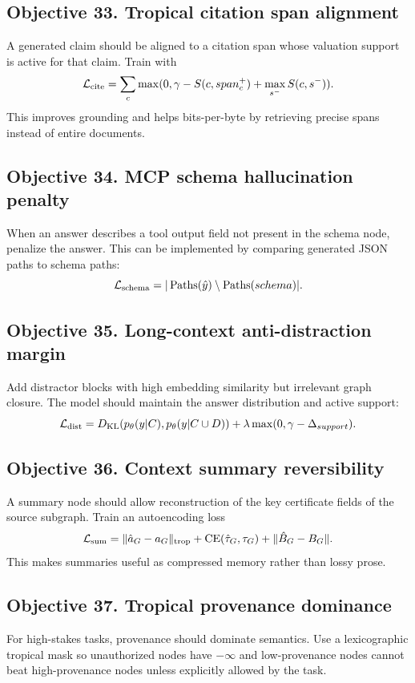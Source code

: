 \documentclass[11pt]{article}
\theoremstyle{definition}
\theoremstyle{remark}
\begin{document}
\subsection{Objective 33. Tropical citation span alignment}
A generated claim should be aligned to a citation span whose valuation support is active for that claim. Train with
\[
    \mathcal L_{\rm cite}=\sum_c\max(0,\gamma-S(c,span_c^+)+\max_{s^-}S(c,s^-)).
\]
This improves grounding and helps bits-per-byte by retrieving precise spans instead of entire documents.

\subsection{Objective 34. MCP schema hallucination penalty}
When an answer describes a tool output field not present in the schema node, penalize the answer. This can be implemented by comparing generated JSON paths to schema paths:
\[
    \mathcal L_{\rm schema}=|\operatorname{Paths}(\hat y)\setminus \operatorname{Paths}(schema)|.
\]

\subsection{Objective 35. Long-context anti-distraction margin}
Add distractor blocks with high embedding similarity but irrelevant graph closure. The model should maintain the answer distribution and active support:
\[
    \mathcal L_{\rm dist}=D_{\rm KL}(p_\theta(y|C),p_\theta(y|C\cup D))+\lambda\max(0,\gamma-\Delta_{support}).
\]

\subsection{Objective 36. Context summary reversibility}
A summary node should allow reconstruction of the key certificate fields of the source subgraph. Train an autoencoding loss
\[
    \mathcal L_{\rm sum}=\|\hat a_G-a_G\|_{\rm trop}+\operatorname{CE}(\hat \tau_G,\tau_G)+\|\hat B_G-B_G\|.
\]
This makes summaries useful as compressed memory rather than lossy prose.

\subsection{Objective 37. Tropical provenance dominance}
For high-stakes tasks, provenance should dominate semantics. Use a lexicographic tropical mask so unauthorized nodes have \(-\infty\) and low-provenance nodes cannot beat high-provenance nodes unless explicitly allowed by the task.
\end{document}
